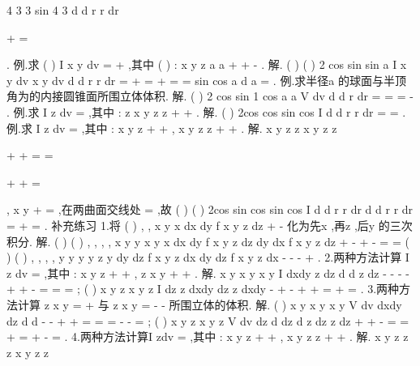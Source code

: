 \int \int \int 
\int \int {} 4
3 3
sin
4 3
d
d
r
r dr
\pi 
\pi 
\theta 
\varphi \varphi 
\pi 
\pi 


\cdots 
+
\cdots 
=






\int 
\int 
\int 
. 
\textcolor{lyred}{例}.求
(
)
I
x
y
dv
\Omega 
=
+
\int \int \int 
,其中
(
)
: x
y
z
a
a
\Omega 
+
+
-
\le 
. 
解.
(
)
(
)
2 cos
sin
sin
a
I
x
y
dv
x
y
dv
d
d
r
r dr
\pi 
\varphi 
\pi 
\theta 
\varphi \varphi 
\varphi 
\Omega 
\Omega 
=
+
=
+
=
\cdots 
=
\int \int \int 
\int \int \int 
\int 
\int 
\int 
sin
cos
a
d
a
\pi 
\pi 
\varphi 
\varphi \varphi 
\pi 
=
\int 
. 
\textcolor{lyred}{例}.求半径a 的球面与半顶角为\alpha 的内接圆锥面所围立体体积. 
解.
(
)
2 cos
sin
1 cos
a
a
V
dv
d
d
r dr
\varphi 
\pi 
\alpha 
\pi 
\theta 
\varphi \varphi 
\alpha 
\Omega 
=
=
=
-
\int \int \int 
\int 
\int 
\int 
. 
\textcolor{lyred}{例}.求
I
z dv
\Omega 
=\int \int \int 
,其中
:
z
x
y
z
z
\Omega 
\le 
+
+
\le 
. 
解.
(
)
2cos
cos
sin
cos
I
d
d
r
r dr
\pi 
\varphi 
\pi 
\varphi 
\theta 
\varphi \varphi 
\varphi 
\pi 
=
\cdots 
=
\int 
\int 
\int 
. 
\textcolor{lyred}{例}.求
I
z dv
\Omega 
=\int \int \int 
,其中
:
x
y
z
\Omega 
+
+
\le ,
x
y
z
z
+
+
\le 
. 
解.
x
y
z
z
x
y
z
z

+
+
=
\Rightarrow 
=

+
+
=

,
x
y
+
=
,在两曲面交线处
\pi 
\varphi =
,故 
(
)
(
)
2cos
sin
cos
sin
cos
I
d
d
r
r dr
d
d
r
r dr
\pi 
\pi 
\varphi 
\pi 
\pi 
\pi 
\theta 
\varphi \varphi 
\varphi 
\theta 
\varphi \varphi 
\varphi 
\pi 
=
+
=
\int 
\int 
\int 
\int 
\int 
\int 
. 
\textcolor{lyred}{补充练习 }
1.将
(
)
, ,
x y
x
dx
dy
f x y z dz
+
-
\int 
\int 
\int 
化为先x ,再z ,后y 的三次积分. 
解.
(
)
(
)
, ,
, ,
x y
y
x y
x
dx
dy
f x y z dz
dy
dx
f x y z dz
+
-
+
-
=
=
\int 
\int 
\int 
\int 
\int 
\int 
(
)
(
)
, ,
, ,
y
y
y
y
z y
dy dz
f x y z dx
dy dz
f x y z dx
-
-
-
+
\int \int 
\int 
\int \int 
\int 
. 
2.两种方法计算
I
z dv
\Omega 
=\int \int \int 
,其中
:
x
y
z
\Omega 
+
+
\le ,
z
x
y
+\ge 
+
. 
解.
x
y
x
y
x
y
I
dxdy
z dz
d
d
z dz
\rho 
\pi 
\rho 
\pi 
\theta \rho \rho 
-
-
-
-
+
\le 
+
-
=
=
=
\int \int 
\int 
\int 
\int 
\int 
; 
(
)
x
y
z
x
y
z
I
dz
z dxdy
dz
z dxdy
\pi 
-
+
\le -
+
\le 
+
=
+
=
\int 
\int \int 
\int 
\int \int 
. 
3.两种方法计算
z
x
y
=
+
与
z
x
y
=
-
-
所围立体的体积. 
解.
(
)
x
y
x
y
x
y
V
dv
dxdy
dz
d
d
\pi 
\theta 
\rho 
\rho \rho \rho 
\pi 
-
-
\Omega 
+
\le 
+
=
\cdots 
=
\cdots 
=
-
-
=
\int \int \int 
\int \int 
\int 
\int 
\int 
; 
(
)
x
y
z
x
y
z
V
dv
dz
d
dz
d
z dz
z dz
\sigma 
\sigma 
\pi 
\pi 
\pi 
\Omega 
+
\le 
+
\le -
=
\cdots 
=
+
=
+
-
=
\int \int \int 
\int 
\int \int 
\int 
\int \int 
\int 
\int 
. 
4.两种方法计算I
zdv
\Omega 
=\int \int \int 
,其中
:
x
y
z
\Omega 
+
+
\le ,
x
y
z
z
+
+
\le 
. 
解.
x
y
z
z
z
x
y
z
z

